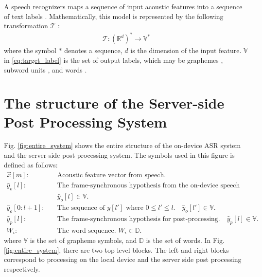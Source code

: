 \documentclass{article}
\begin{document}
A speech recognizers maps a sequence of input acoustic features into a sequence 
of text labels  \cite{r_prabhavalkar_interspeech_2017_00}. 
Mathematically, this model is 
represented by the following transformation $\mathcal{T}$ 
\cite{a_graves_icml_2006_00}:
\begin{align}
  \mathcal{T} : \left(\mathbb{R}^d\right)^{*} \rightarrow \mathbb{V}^{*}
	\label{eq:transformation}
\end{align}
where the symbol ${*}$ denotes a sequence, $d$ is the dimension of the input 
feature. $\mathbb{V}$ in \eqref{eq:target_label} is the set of output
labels, which may be graphemes 
\cite{j_chorowski_nips_2015_00,
w_chan_icassp_2016_00},
subword units \cite{
a_zeyer_interspeech_2018_00,
c_chiu_icassp_2018_00},
 and words \cite{h_soltau_interspeech_2017_00}.

 

\section{The structure of the Server-side Post Processing System}

Fig. \ref{fig:entire_system} shows the entire structure of the on-device ASR
system and the server-side post processing system. 
The symbols used in this figure is defined as follows:
%
\begin{align}
  \vec{x}[m]:& \quad \text{Acoustic feature vector from speech.}  \nonumber \\
  \hat{y}_o[l]:& \quad \text{The frame-synchronous hypothesis from the
  on-device speech recognizer.}   \nonumber \\
       & \quad \hat{y}_o[l] \in \mathbb{V}.  \nonumber \\
  \hat{y}_o[0:l+1]  : & \quad \text{The sequence of $y[l']$ where } 0 \le l'
  \le l. \quad  \hat{y}_o[l'] \in \mathbb{V}.  \nonumber \\ 
  \hat{y}_p[l]:& \quad \text{The frame-synchronous hypothesis for post-processing.}
  \quad \hat{y}_p[l] \in \mathbb{V}.   \nonumber \\
  W_i: & \quad \text{The word sequence. } W_i \in  \mathbb{D}.  \nonumber 
\end{align}
where $\mathbb{V}$ is the set of grapheme symbols, and $\mathbb{D}$ is the
set of words. In Fig. \ref{fig:entire_system}, there are two top level
blocks. The left and right blocks correspond to processing on the local
device and the server side post processing respectively.
\end{document}
